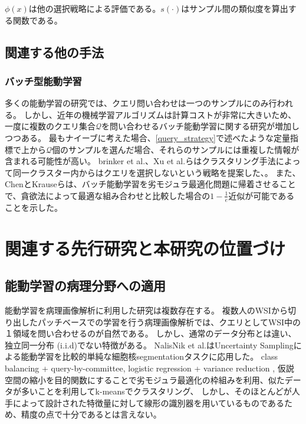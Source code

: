 $\phi(x)$は他の選択戦略による評価である。$s(\cdot)$はサンプル間の類似度を算出する関数である。

\subsection{関連する他の手法}

\subsubsection{バッチ型能動学習}
多くの能動学習の研究では、クエリ問い合わせは一つのサンプルにのみ行われる。
しかし、近年の機械学習アルゴリズムは計算コストが非常に大きいため、一度に複数のクエリ集合$\mathcal{Q}$を問い合わせるバッチ能動学習に関する研究が増加しつつある。
最もナイーブに考えた場合、\ref{query_strategy}で述べたような定量指標で上から$\mathcal{Q}$個のサンプルを選んだ場合、それらのサンプルには重複した情報が含まれる可能性が高い。
brinker et al.、Xu et al.らはクラスタリング手法によって同一クラスター内からはクエリを選択しないという戦略を提案した\cite{brinker2003incorporating}、\cite{Xu2007}。
また、ChenとKrauseらは、バッチ能動学習を劣モジュラ最適化問題に帰着させることで、貪欲法によって最適な組み合わせと比較した場合の$1 - \frac{1}{e}$近似が可能であることを示した。
\cite{chen2013near}


\section{関連する先行研究と本研究の位置づけ}

\subsection{能動学習の病理分野への適用}
能動学習を病理画像解析に利用した研究は複数存在する。
複数人のWSIから切り出したパッチベースでの学習を行う病理画像解析では、クエリとしてWSI中の１領域を問い合わせるのが自然である。
しかし、通常のデータ分布とは違い、独立同一分布 (i.i.d)でない特徴がある。
NalisNik et al.はUncertainty Samplingによる能動学習を比較的単純な細胞核segmentationタスクに応用した\cite{nalisnik2017interactive}。
class balancing + query-by-committee\cite{doyle2011active}, 
logistic regression + variance reduction \cite{padmanabhan2014active},
仮説空間の縮小を目的関数にすることで劣モジュラ最適化の枠組みを利用、似たデータが多いことを利用してk-meansでクラスタリング\cite{zhu2014scalable}、
しかし、そのほとんどが人手によって設計された特徴量に対して線形の識別器を用いているものであるため、精度の点で十分であるとは言えない。

